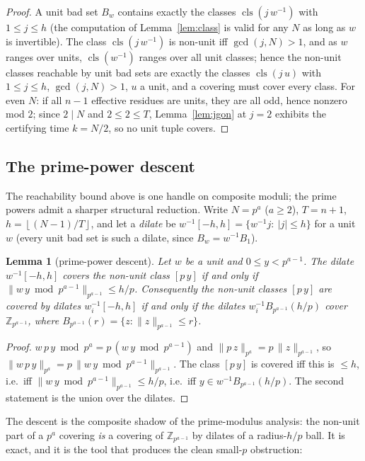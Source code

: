 \documentclass[11pt,a4paper]{article}
\numberwithin{equation}{section}
\theoremstyle{plain}
\newtheorem{lemma}[theorem]{Lemma}
\theoremstyle{definition}
\theoremstyle{remark}
\newcommand{\Z}{\mathbb{Z}}
\newcommand{\floor}[1]{\left\lfloor #1 \right\rfloor}
\DeclareMathOperator{\cls}{cls}
\begin{document}
\begin{proof}
A unit bad set $B_w$ contains exactly the classes $\cls(j\,w^{-1})$ with
$1\le j\le h$ (the computation of Lemma~\ref{lem:class} is valid for any
$N$ as long as $w$ is invertible). The class $\cls(j\,w^{-1})$ is
non-unit iff $\gcd(j,N)>1$, and as $w$ ranges over units, $\cls(w^{-1})$
ranges over all unit classes; hence the non-unit classes reachable by unit
bad sets are exactly the classes $\cls(j\,u)$ with $1\le j\le h$,
$\gcd(j,N)>1$, $u$ a unit, and a covering must cover every class. For
even $N$: if all $n-1$ effective residues are units, they are all odd,
hence nonzero mod $2$; since $2\mid N$ and $2\le 2\le T$,
Lemma~\ref{lem:jgon} at $j=2$ exhibits the certifying time $k=N/2$, so
no unit tuple covers.
\end{proof}

\subsection{The prime-power descent}\label{sec:pq-descent}

The reachability bound above is one handle on composite moduli; the
prime powers admit a sharper structural reduction. Write $N=p^a$
($a\ge 2$), $T=n+1$, $h=\floor{(N-1)/T}$, and let a \emph{dilate} be
$w^{-1}[-h,h]=\{w^{-1}j:\ |j|\le h\}$ for a unit $w$ (every unit bad set
is such a dilate, since $B_w=w^{-1}B_1$).

\begin{lemma}[prime-power descent]\label{lem:pq-descent}
Let $w$ be a unit and $0\le y<p^{a-1}$. The dilate $w^{-1}[-h,h]$ covers
the non-unit class $[p\,y]$ if and only if
$\lVert w\,y\bmod p^{a-1}\rVert_{p^{a-1}}\le h/p$. Consequently the
non-unit classes $[p\,y]$ are covered by dilates $w_i^{-1}[-h,h]$ if and
only if the dilates $w_i^{-1}B_{p^{a-1}}(h/p)$ cover $\Z_{p^{a-1}}$,
where $B_{p^{a-1}}(r)=\{z:\lVert z\rVert_{p^{a-1}}\le r\}$.
\end{lemma}

\begin{proof}
$w\,p\,y\bmod p^a=p\,(w\,y\bmod p^{a-1})$ and
$\lVert p\,z\rVert_{p^a}=p\,\lVert z\rVert_{p^{a-1}}$, so
$\lVert w\,p\,y\rVert_{p^a}=p\,\lVert w\,y\bmod p^{a-1}\rVert_{p^{a-1}}$.
The class $[p\,y]$ is covered iff this is $\le h$, i.e.\ iff
$\lVert w\,y\bmod p^{a-1}\rVert_{p^{a-1}}\le h/p$, i.e.\ iff
$y\in w^{-1}B_{p^{a-1}}(h/p)$. The second statement is the union over the
dilates.
\end{proof}

The descent is the composite shadow of the prime-modulus analysis: the
non-unit part of a $p^a$ covering \emph{is} a covering of $\Z_{p^{a-1}}$
by dilates of a radius-$h/p$ ball. It is exact, and it is the tool that
produces the clean small-$p$ obstruction:
\end{document}
